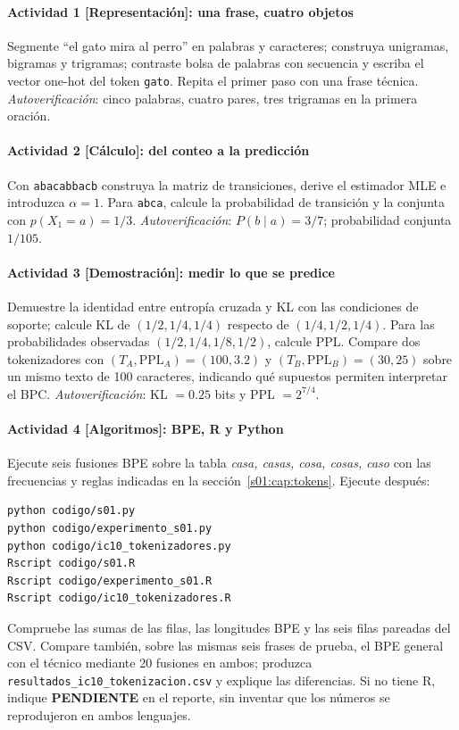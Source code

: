 \paragraph{Actividad 1 [Representación]: una frase, cuatro objetos}
Segmente ``el gato mira al perro'' en palabras y caracteres; construya
unigramas, bigramas y trigramas; contraste bolsa de palabras con secuencia y
escriba el vector one-hot del token \texttt{gato}. Repita el primer paso con
una frase técnica. \emph{Autoverificación}: cinco palabras, cuatro pares,
tres trigramas en la primera oración.
\paragraph{Actividad 2 [Cálculo]: del conteo a la predicción}
Con \texttt{abacabbacb} construya la matriz de transiciones, derive el
estimador MLE e introduzca $\alpha=1$. Para \texttt{abca}, calcule la
probabilidad de transición y la conjunta con $p(X_1=a)=1/3$.
\emph{Autoverificación}: $P(b\mid a)=3/7$; probabilidad conjunta $1/105$.
\paragraph{Actividad 3 [Demostración]: medir lo que se predice}
Demuestre la identidad entre entropía cruzada y KL con las condiciones de
soporte; calcule KL de $(1/2,1/4,1/4)$ respecto de
$(1/4,1/2,1/4)$. Para las probabilidades observadas
$(1/2,1/4,1/8,1/2)$, calcule PPL. Compare dos tokenizadores con
$(T_A,\mathrm{PPL}_A)=(100,3.2)$ y $(T_B,\mathrm{PPL}_B)=(30,25)$
sobre un mismo texto de 100 caracteres, indicando qué supuestos permiten
interpretar el BPC. \emph{Autoverificación}: KL $=0.25$ bits y
PPL $=2^{7/4}$.
\paragraph{Actividad 4 [Algoritmos]: BPE, R y Python}
Ejecute seis fusiones BPE sobre la tabla \emph{casa, casas, cosa, cosas,
caso} con las frecuencias y reglas indicadas en la sección~\ref{s01:cap:tokens}. Ejecute después:
\begin{verbatim}
python codigo/s01.py
python codigo/experimento_s01.py
python codigo/ic10_tokenizadores.py
Rscript codigo/s01.R
Rscript codigo/experimento_s01.R
Rscript codigo/ic10_tokenizadores.R
\end{verbatim}
Compruebe las sumas de las filas, las longitudes BPE y las seis filas
pareadas del CSV. Compare también, sobre las mismas seis frases
de prueba, el BPE general con el técnico mediante 20 fusiones en ambos;
produzca \nolinkurl{resultados_ic10_tokenizacion.csv} y explique las diferencias.
Si no tiene R, indique \textbf{PENDIENTE} en el reporte,
sin inventar que los números se reprodujeron en ambos lenguajes.
